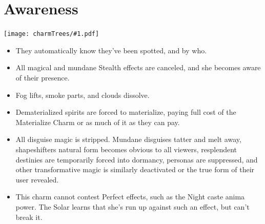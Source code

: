 \documentclass[oneside]{book}
\newenvironment{Ability}[1]{%
  \section{#1}%
  \vspace{-0.25in}\hspace*{-0.75in}\texttt{[image: charmTrees/\#1.pdf]}%
  \begin{multicols}{2}
}
{
  \end{multicols}
}
\begin{document}
\begin{Ability}{Awareness}
  \begin{itemize}
    \item They automatically know they've been spotted, and by who.
    \item All magical and mundane Stealth effects are canceled, and she becomes aware of their presence.
    \item Fog lifts, smoke parts, and clouds dissolve.
    \item Dematerialized spirits are forced to materialize, paying full cost of the Materialize Charm or as much of it as they can pay.
    \item All disguise magic is stripped. Mundane disguises tatter and melt away, shapeshifters natural form becomes obvious to all viewers, resplendent destinies are temporarily forced into dormancy, personas are suppressed, and other transformative magic is similarly deactivated or the true form of their user revealed.
    \item This charm cannot contest Perfect effects, such as the Night caste anima power. The Solar learns that she's run up against such an effect, but can't break it.
  \end{itemize}

\end{Ability}
\end{document}
